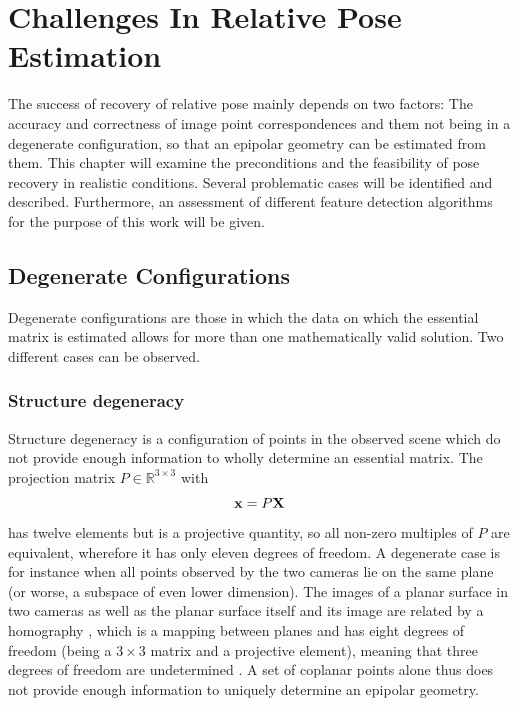 \chapter{Challenges In Relative Pose Estimation}

The success of recovery of relative pose mainly depends on two factors: The
accuracy and correctness of image point correspondences and them not being in a
degenerate configuration, so that an epipolar geometry can be estimated from
them.  This chapter will examine the preconditions and the feasibility of pose
recovery in realistic conditions. Several problematic cases will be identified
and described. Furthermore, an assessment of different feature detection
algorithms for the purpose of this work will be given.

\section{Degenerate Configurations}

Degenerate configurations are those in which the data on which the essential
matrix is estimated allows for more than one mathematically valid solution. Two
different cases can be observed.

\subsection{Structure degeneracy}

Structure degeneracy is a configuration of points in the observed scene which do
not provide enough information to wholly determine an essential matrix. The
projection matrix $P\in\mathbb{R}^{3\times3}$ with 
\begin{equation*}
   \mathbf{x} = P\mathbf{X}
\end{equation*}
has twelve elements but is a projective quantity, so all non-zero multiples of
$P$ are equivalent, wherefore it has only eleven degrees of freedom.  A
degenerate case is for instance when all points observed by the two cameras lie
on the same plane (or worse, a subspace of even lower dimension). The images of
a planar surface in two cameras as well as the planar surface itself and its
image are related by a homography \citep[see][ch. 13]{h&z2004}, which is a
mapping between planes and has eight degrees of freedom (being a $3\times3$
matrix and a projective element), meaning that three degrees of freedom are
undetermined \citep{torr1999}. A set of coplanar points alone thus does not provide
enough information to uniquely determine an epipolar geometry.

